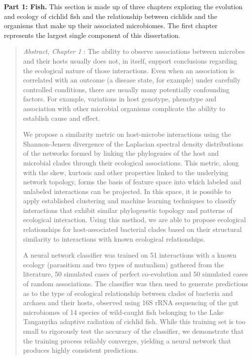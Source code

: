 
\noindent\textbf{Part 1: Fish.} 
This section is made up of three chapters exploring the evolution and ecology of cichlid fish and the relationship between cichlids and the organisms that make up their associated microbiomes. The first chapter represents the largest single component of this dissertation. 

\begin{quote}
\textit{Abstract, Chapter 1} : The ability to observe associations between microbes and their hosts usually does not, in itself, support conclusions regarding the ecological nature of those interactions. Even when an association is correlated with an outcome (a disease state, for example) under carefully controlled conditions, there are usually many potentially confounding factors. For example, variations in host genotype, phenotype and association with other microbial organisms complicate the ability to establish cause and effect.

We propose a similarity metric on host-microbe interactions using the Shannon-Jensen divergence of the Laplacian spectral density distributions of the networks formed by linking the phylogenies of the host and microbial clades through their ecological associations. This metric, along with the skew, kurtosis and other properties linked to the underlying network topology, forms the basis of feature space into which labeled and unlabeled interactions can be projected. In this space, it is possible to apply established clustering and machine learning techniques to classify interactions that exhibit similar phylogenetic topology and patterns of ecological interaction. Using this method, we are able to propose ecological relationships for host-associated bacterial clades based on their structural similarity to interactions with known ecological relationships.

A neural network classifier was trained on 51 interactions with a known ecology (parasitism and two types of mutualism) gathered from the literature, 50 simulated cases of perfect co-evolution and 50 simulated cases of random associations. The classifier was then used to generate predictions as to the type of ecological relationship between clades of bacteria and archaea and their hosts, observed using 16S rRNA sequencing of the gut microbiomes of 14 species of wild-caught fish belonging to the Lake Tanganyika adaptive radiation of cichlid fish. While this training set is too small to rigorously test the accuracy of the classifier, we demonstrate that the training process reliably converges, yielding a neural network that produces highly consistent predictions.
\end{quote}

